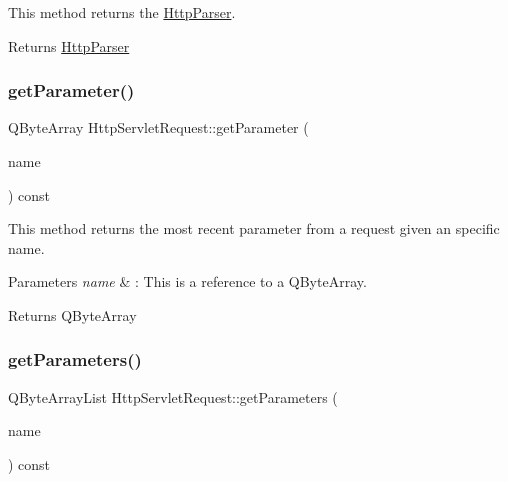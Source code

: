 This method returns the \hyperlink{class_http_parser}{Http\+Parser}. 

\begin{DoxyReturn}{Returns}
\hyperlink{class_http_parser}{Http\+Parser} 
\end{DoxyReturn}
\mbox{\label{class_http_servlet_request_a707c561d255615792ebe3bc9b8e3896c}} 
\subsubsection{\texorpdfstring{get\+Parameter()}{getParameter()}}
{\footnotesize\ttfamily Q\+Byte\+Array Http\+Servlet\+Request\+::get\+Parameter (\begin{DoxyParamCaption}\item[{const Q\+Byte\+Array \&}]{name }\end{DoxyParamCaption}) const}



This method returns the most recent parameter from a request given an specific name. 


\begin{DoxyParams}{Parameters}
{\em name} & \+: This is a reference to a Q\+Byte\+Array. \\
\hline
\end{DoxyParams}
\begin{DoxyReturn}{Returns}
Q\+Byte\+Array 
\end{DoxyReturn}
\mbox{\label{class_http_servlet_request_ab361a363bdd6d627aecba897dd12809b}} 
\subsubsection{\texorpdfstring{get\+Parameters()}{getParameters()}}
{\footnotesize\ttfamily Q\+Byte\+Array\+List Http\+Servlet\+Request\+::get\+Parameters (\begin{DoxyParamCaption}\item[{const Q\+Byte\+Array \&}]{name }\end{DoxyParamCaption}) const}



